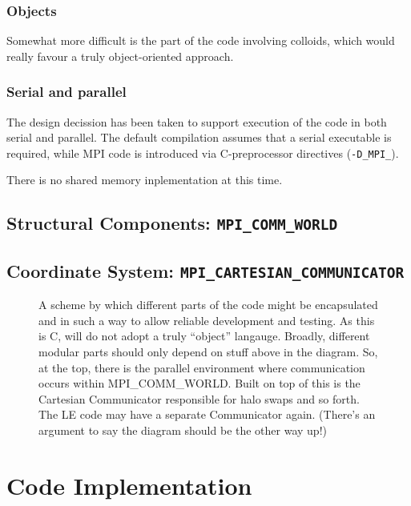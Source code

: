 \subsubsection{Objects}

Somewhat more difficult is the part of the code involving
colloids, which would really favour a truly object-oriented
approach.

\subsubsection{Serial and parallel}

The design decission has been taken to support execution of the
code in both serial and parallel. The default compilation
assumes that a serial executable is required, while  MPI code
is introduced via C-preprocessor directives (\texttt{-D\_MPI\_}).


There is no shared memory inplementation at this time.


\subsection{Structural Components: \texttt{MPI\_COMM\_WORLD}}


\subsection{Coordinate System: \texttt{MPI\_CARTESIAN\_COMMUNICATOR}}


\begin{figure}
\begin{center}
\end{center}
\caption{A scheme by which different parts of the code might be
encapsulated and in such a way to allow reliable development and
testing. As this is C, will do not adopt a truly ``object'' langauge.
Broadly, different modular parts should only depend on stuff above
in the diagram. So, at the top, there is the parallel environment
where communication occurs within MPI\_COMM\_WORLD. Built on top
of this is the Cartesian Communicator responsible for halo swaps
and so forth. The LE code may have a separate Communicator again. 
(There's an argument to say the diagram should be the other way up!)}
\end{figure}



\section{Code Implementation}

